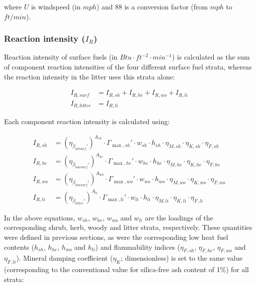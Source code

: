 \documentclass[]{book}
\begin{document}
where \(U\) is windspeed (in \(mph\)) and \(88\) is a conversion factor
(from \(mph\) to \(ft/min\)).

\subsubsection{\texorpdfstring{Reaction intensity
(\(I_R\))}{Reaction intensity (I\_R)}}\label{reaction-intensity-i_r}

Reaction intensity of surface fuels (in
\(Btu \cdot ft^{-2} \cdot min^{-1}\)) is calculated as the sum of
component reaction intensities of the four different surface fuel
strata, whereas the reaction intensity in the litter uses this strata
alone:

\begin{eqnarray} 
I_{R,surf} &= I_{R, sh} + I_{R, he}+ I_{R, wo}+I_{R, li}\\
I_{R,litter} &= I_{R, li}
\label{eq:reactintensity}
\end{eqnarray}

Each component reaction intensity is calculated using:

\begin{eqnarray} 
I_{R,sh} &= (\eta_{\beta_{allsurf}'})^{A_{sh}}\cdot \Gamma_{\max, sh}'\cdot w_{sh} \cdot h_{sh} \cdot \eta_{M,sh}\cdot \eta_{K,sh}\cdot \eta_{F,sh}\\
I_{R,he} &= (\eta_{\beta_{lowsurf}'})^{A_{he}}\cdot \Gamma_{\max, he}'\cdot w_{he} \cdot h_{he} \cdot \eta_{M,he}\cdot \eta_{K,he}\cdot \eta_{F,he}\\
I_{R,wo} &= (\eta_{\beta_{lowsurf}'})^{A_{wo}}\cdot \Gamma_{\max, wo}'\cdot w_{wo} \cdot h_{wo} \cdot \eta_{M,wo}\cdot \eta_{K,wo}\cdot \eta_{F,wo}\\
I_{R,li} &= (\eta_{\beta_{litter}'})^{A_{li}}\cdot \Gamma_{\max, li}'\cdot w_{li} \cdot h_{li} \cdot \eta_{M,li}\cdot \eta_{K,li}\cdot \eta_{F,li}
\label{eq:reactintensitycomp}
\end{eqnarray}

In the above equations, \(w_{sh}\), \(w_{he}\), \(w_{wo}\) and
\(w_{li}\) are the loadings of the corresponding shrub, herb, woody and
litter strata, respectively. These quantities were defined in previous
sections, as were the corresponding low heat fuel contents (\(h_{sh}\),
\(h_{he}\), \(h_{wo}\) and \(h_{li}\)) and flammability indices
(\(\eta_{F,sh}\), \(\eta_{F,he}\), \(\eta_{F,wo}\) and \(\eta_{F,li}\)).
Mineral damping coefficient (\(\eta_{K}\); dimensionless) is set to the
same value (corresponding to the conventional value for silica-free ash
content of 1\%) for all strata:
\end{document}
